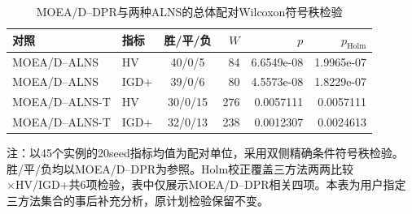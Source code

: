 \begin{table}[htbp]
\centering
\caption{MOEA/D–DPR与两种ALNS的总体配对Wilcoxon符号秩检验}
\label{tab:three-method-test}
\begin{tabular}{llcrrr}
\toprule
对照 & 指标 & 胜/平/负 & $W$ & $p$ & $p_{\mathrm{Holm}}$ \\
\midrule
MOEA/D–ALNS & HV & 40/0/5 & 84 & 6.6549e-08 & 1.9965e-07 \\
MOEA/D–ALNS & IGD+ & 39/0/6 & 80 & 4.5573e-08 & 1.8229e-07 \\
MOEA/D–ALNS-T & HV & 30/0/15 & 276 & 0.0057111 & 0.0057111 \\
MOEA/D–ALNS-T & IGD+ & 32/0/13 & 238 & 0.0012307 & 0.0024613 \\
\bottomrule
\end{tabular}
\par\smallskip
\begin{minipage}{0.98\linewidth}\footnotesize
注：以45个实例的20seed指标均值为配对单位，采用双侧精确条件符号秩检验。胜/平/负均以MOEA/D–DPR为参照。Holm校正覆盖三方法两两比较×HV/IGD+共6项检验，表中仅展示MOEA/D–DPR相关四项。本表为用户指定三方法集合的事后补充分析，原计划检验保留不变。
\end{minipage}
\end{table}
